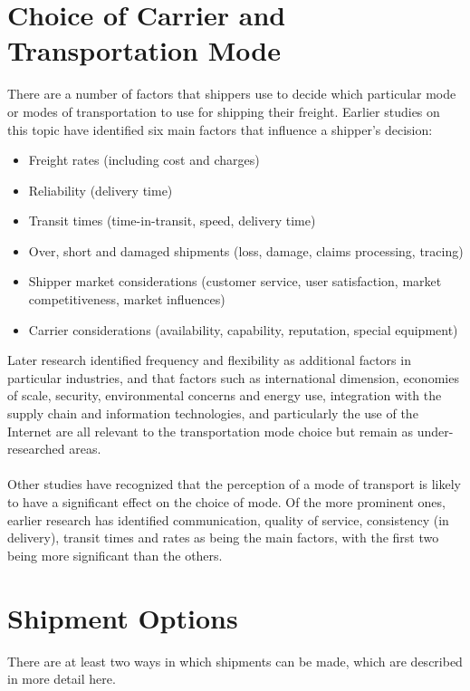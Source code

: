 \section{Choice of Carrier and Transportation Mode}
There are a number of factors that shippers use to decide which particular mode or modes of transportation to use for shipping their freight. Earlier studies on this topic have identified six main factors that influence a shipper’s decision:
\begin{itemize}
	\item Freight rates (including cost and charges)
	\item Reliability (delivery time)
	\item Transit times (time-in-transit, speed, delivery time)
	\item Over, short and damaged shipments (loss, damage, claims processing, tracing)
	\item Shipper market considerations (customer service, user satisfaction, market competitiveness, market influences)
	\item Carrier considerations (availability, capability, reputation, special equipment)
\end{itemize}
Later research identified frequency and flexibility as additional factors in particular industries, and that factors such as international dimension, economies of scale, security, environmental concerns and energy use, integration with the supply chain and information technologies, and particularly the use of the Internet are all relevant to the transportation mode choice but remain as under-researched areas.
\paragraph{}
Other studies have recognized that the perception of a mode of transport
is likely to have a significant effect on the choice of mode. Of the more prominent ones, earlier research has identified communication, quality of service, consistency (in delivery), transit times and rates as being the main factors, with the first two being more significant than the others.
%
\section{Shipment Options}
There are at least two ways in which shipments can be made, which are described in more detail here.
%
